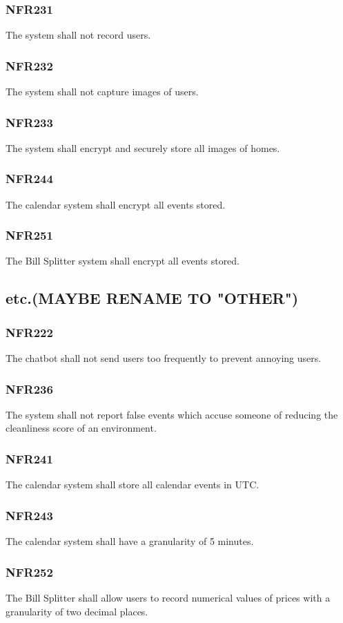 \documentclass[12pt, titlepage]{article}
\begin{document}
\subsubsection{NFR231}
The system shall not record users.
\subsubsection{NFR232}
The system shall not capture images of users.
\subsubsection{NFR233}
The system shall encrypt and securely store all images of homes.
\subsubsection{NFR244}
The calendar system shall encrypt all events stored.
\subsubsection{NFR251}
The Bill Splitter system shall encrypt all events stored.


\subsection{etc.(MAYBE RENAME TO "OTHER")}
\subsubsection{NFR222}
The chatbot shall not send users too frequently to prevent
annoying users.
\subsubsection{NFR236}
The system shall not report false events which accuse someone of
reducing the cleanliness score of an environment.
\subsubsection{NFR241}
The calendar system shall store all calendar events in UTC.
\subsubsection{NFR243}
The calendar system shall have a granularity of 5 minutes.
\subsubsection{NFR252}
The Bill Splitter shall allow users to record numerical values of
prices with a granularity of two decimal places.
\end{document}
